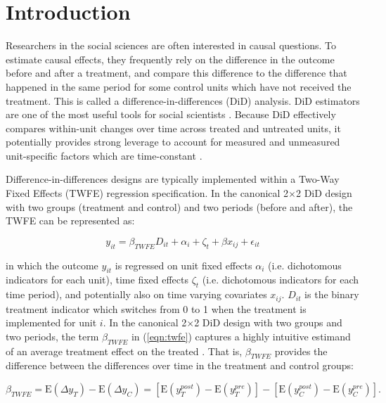 \thispagestyle{empty}
\clearpage
\onehalfspacing


\section{Introduction}

Researchers in the social sciences are often interested in causal questions. To estimate causal effects, they frequently rely on the difference in the outcome before and after a treatment, and compare this difference to the difference that happened in the same period for some control units which have not received the treatment. This is called a difference-in-differences (DiD) analysis. DiD estimators are one of the most useful tools for social scientists \cite{Angrist.2015, Huntington-Klein.2021}. Because DiD effectively compares within-unit changes over time across treated and untreated units, it potentially provides strong leverage to account for measured and unmeasured unit-specific factors which are time-constant \cite{Wooldridge.2010}. 

Difference-in-differences designs are typically implemented within a Two-Way Fixed Effects (TWFE) regression specification. In the canonical 2$\times$2 DiD design with two groups (treatment and control) and two periods (before and after), the TWFE can be represented as:  

\begin{equation}
\label{eqn:twfe}
y_{it} = \beta_{TWFE} D_{it} + \alpha_i + \zeta_t + \beta x_{ij} + \epsilon_{it}
\end{equation}

\noindent in which the outcome $y_{it}$ is regressed on unit fixed effects $\alpha_i$ (i.e. dichotomous indicators for each unit), time fixed effects $\zeta_t$ (i.e. dichotomous indicators for each time period), and potentially also on time varying covariates $x_{ij}$. $D_{it}$ is the binary treatment indicator which switches from 0 to 1 when the treatment is implemented for unit $i$. In the canonical  2$\times$2 DiD design with two groups and two periods, the term $\beta_{TWFE}$ in (\ref{eqn:twfe}) captures a highly intuitive estimand of an average treatment effect on the treated \cite[ATT,~][]{Wooldridge.2010}. That is, $\beta_{TWFE}$ provides the difference between the differences over time in the treatment and control groups:

\begin{equation}
\label{eqn:did}
\beta_{TWFE} = \mathrm{E}(\Delta y_{T}) - \mathrm{E}(\Delta y_{C}) = [\mathrm{E}(y_{T}^{post}) - \mathrm{E}(y_{T}^{pre})] - [\mathrm{E}(y_{C}^{post}) - \mathrm{E}(y_{C}^{pre})].
\end{equation}

